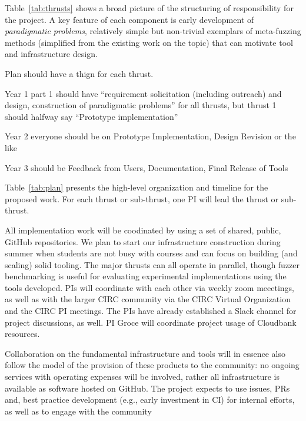 Table~\ref{tab:thrusts} shows a broad picture of the structuring of
responsibility for the project.  A key feature of each component is early
development of \emph{paradigmatic problems}, relatively simple but
non-trivial exemplars of meta-fuzzing methods (simplified from the
existing work on the topic) that can motivate tool and infrastructure design.
                 

  Plan should have a thign for each thrust.

  Year 1 part 1 should have ``requirement solicitation (including
  outreach) and design, construction of paradigmatic problems'' for all
  thrusts, but thrust 1 should halfway say ``Prototype
  implementation''

  Year 2 everyone should be on Prototype Implementation, Design
  Revision or the like

  Year 3 should be Feedback from Users, Documentation, Final Release
  of Tools


Table~\ref{tab:plan} presents the high-level organization and timeline for the 
proposed
work. For each thrust or sub-thrust, one PI will lead the thrust or sub-thrust.

All implementation work will be coodinated by using a set of shared, public, 
GitHub repositories.    We plan to start our
infrastructure construction during summer when students are
not busy with courses and can focus on
building (and scaling) solid tooling.  The major thrusts can all operate in 
parallel, though fuzzer benchmarking is useful for evaluating experimental 
implementations using the tools developed.  PIs will coordinate with
each other via
weekly zoom meeetings, as well as with the larger CIRC community via the
CIRC Virtual Organization and the CIRC PI meetings.  The PIs have
already established a Slack channel for project discussions, as well.
PI Groce will coordinate project usage of Cloudbank resources.

Collaboration on the fundamental infrastructure and tools will in
essence also follow the model of the provision of these products to
the community: no ongoing services with operating expenses will be
involved, rather all infrastructure is available as software hosted on
GitHub.  The project expects to use issues, PRs and, best practice
development (e.g., early investment in CI)
for internal efforts, as well as to engage with the community


